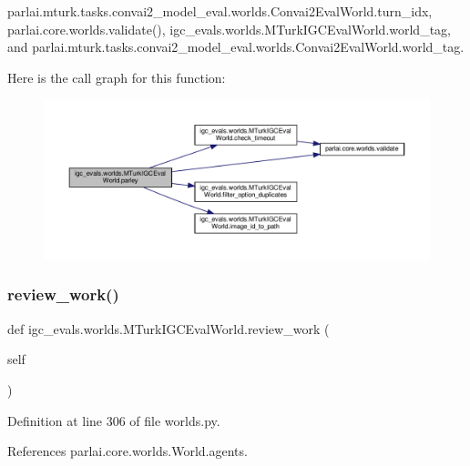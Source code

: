 parlai.\+mturk.\+tasks.\+convai2\+\_\+model\+\_\+eval.\+worlds.\+Convai2\+Eval\+World.\+turn\+\_\+idx, parlai.\+core.\+worlds.\+validate(), igc\+\_\+evals.\+worlds.\+M\+Turk\+I\+G\+C\+Eval\+World.\+world\+\_\+tag, and parlai.\+mturk.\+tasks.\+convai2\+\_\+model\+\_\+eval.\+worlds.\+Convai2\+Eval\+World.\+world\+\_\+tag.

Here is the call graph for this function\+:
\nopagebreak
\begin{figure}[H]
\begin{center}
\leavevmode
\includegraphics[width=350pt]{classigc__evals_1_1worlds_1_1MTurkIGCEvalWorld_ab2ddf25bf050e7f12d675dc910c04a3d_cgraph}
\end{center}
\end{figure}
\mbox{\label{classigc__evals_1_1worlds_1_1MTurkIGCEvalWorld_aa3a8ea3999f002288078223aa079d76d}} 
\subsubsection{\texorpdfstring{review\+\_\+work()}{review\_work()}}
{\footnotesize\ttfamily def igc\+\_\+evals.\+worlds.\+M\+Turk\+I\+G\+C\+Eval\+World.\+review\+\_\+work (\begin{DoxyParamCaption}\item[{}]{self }\end{DoxyParamCaption})}



Definition at line 306 of file worlds.\+py.



References parlai.\+core.\+worlds.\+World.\+agents.

